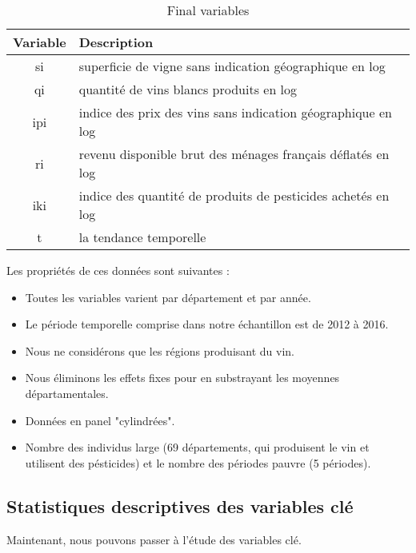 \documentclass[11pt, a4paper]{article}
\begin{document}
\begin{table}[!htbp]
  \centering
  \begin{tabular}{c|l}
    \hline
    Variable & Description \\
    \hline
  si & superficie de vigne sans indication géographique en log \\
  qi & quantité de vins blancs produits en log \\
  ipi & indice des prix des vins sans indication géographique en log \\
  ri & revenu disponible brut des ménages français déflatés en log \\
  iki & indice des quantité de produits de pesticides achetés en log \\
  t & la tendance temporelle \\
  \hline
  \end{tabular}  
\caption{Final variables}
\end{table}
\FloatBarrier
Les propriétés de ces données sont suivantes :
\begin{itemize}
  \item Toutes les variables varient par département et par année.
  \item Le période temporelle comprise dans notre échantillon est de 2012 à 2016.
  \item Nous ne considérons que les régions produisant du vin. 
  \item Nous éliminons les effets fixes pour en substrayant les moyennes départamentales.
  \item Données en panel "cylindrées".
  \item Nombre des individus large (69 départements, qui produisent le vin et utilisent des pésticides) et le nombre des périodes pauvre (5 périodes).
\end{itemize}

\subsection{Statistiques descriptives des variables clé}
Maintenant, nous pouvons passer à l'étude des variables clé.
\end{document}
